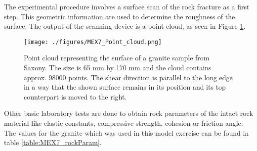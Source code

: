 The experimental procedure involves a surface scan of the rock fracture as a first step. This geometric information are used to determine the roughness of the surface. The output of the scanning device is a point cloud, as seen in Figure \ref{fig:MEX7_pointCloud}.

\begin{figure}[!ht]
\begin{center}
\texttt{[image: ./figures/MEX7\_Point\_cloud.png]}
\end{center}
\caption{Point cloud representing the surface of a granite sample from Saxony. The size is 65 mm by 170 mm and the cloud contains approx. 98000 points. The shear direction is parallel to the long edge in a way that the shown surface remains in its position and its top counterpart is moved to the right.}
\label{fig:MEX7_pointCloud}
\end{figure}

Other basic laboratory tests are done to obtain rock parameters of the intact rock material like elastic constants, compressive strength, cohesion or friction angle. The values for the granite which was used in this model exercise can be found in table \ref{table:MEX7_rockParam}.


